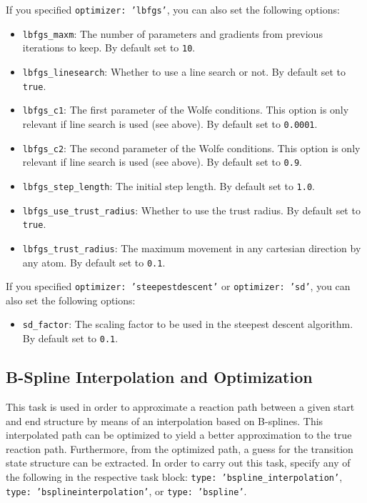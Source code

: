 \documentclass[]{tufte-book}
\begin{document}
If you specified \texttt{optimizer: 'lbfgs'}, you can also set the following options:
\begin{itemize}
\item \texttt{lbfgs\_maxm}: The number of parameters and gradients from previous iterations to keep. By default set to
\texttt{10}.
\item \texttt{lbfgs\_linesearch}: Whether to use a line search or not. By default set to \texttt{true}.
\item \texttt{lbfgs\_c1}: The first parameter of the Wolfe conditions. This option is only relevant if line search is
used (see above). By default set to \texttt{0.0001}.
\item \texttt{lbfgs\_c2}:  The second parameter of the Wolfe conditions. This option is only relevant if line search is
used (see above). By default set to \texttt{0.9}.
\item \texttt{lbfgs\_step\_length}: The initial step length. By default set to \texttt{1.0}.
\item \texttt{lbfgs\_use\_trust\_radius}: Whether to use the trust radius. By default set to \texttt{true}.
\item \texttt{lbfgs\_trust\_radius}: The maximum movement in any cartesian direction by any atom. By default set to \texttt{0.1}.
\end{itemize}

If you specified \texttt{optimizer: 'steepestdescent'} or \texttt{optimizer: 'sd'}, you can also set the following options:
\begin{itemize}
\item \texttt{sd\_factor}: The scaling factor to be used in the steepest descent algorithm. By default set to \texttt{0.1}.
\end{itemize}

\subsection{B-Spline Interpolation and Optimization}\label{sec: b-spline}

This task is used in order to approximate a reaction path between a given start and end structure by means of an
interpolation based on B-splines\cite{bsplines}. This interpolated path can be optimized to yield a better approximation
to the true reaction path. Furthermore, from the optimized path, a guess for the transition state structure can be
extracted. In order to carry out this task, specify any of the following in the respective task block: \texttt{type: 'bspline\_interpolation'},
\texttt{type: 'bsplineinterpolation'}, or \texttt{type: 'bspline'}.
\end{document}
